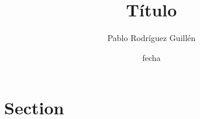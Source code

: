 \documentclass[11pt,a4paper]{article}
\title{\textbf{Título}}
\author{Pablo Rodríguez Guillén}
\date{fecha}
\begin{document}

\onehalfspacing
\maketitle
\tableofcontents
\newpage

\section{Section}


% 
% 
\end{document}
